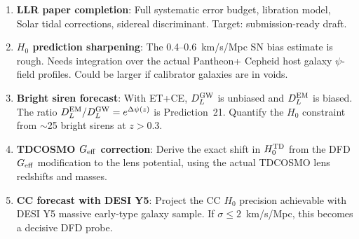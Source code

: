 \documentclass[11pt,a4paper]{article}
\newcommand{\Dpsi}{\Delta\psi}
\begin{document}
\begin{enumerate}

\item \textbf{LLR paper completion}: Full systematic error budget,
  libration model, Solar tidal corrections, sidereal discriminant.
  Target: submission-ready draft.

\item \textbf{$H_0$ prediction sharpening}: The 0.4--0.6~km/s/Mpc
  SN bias estimate is rough. Needs integration over the actual
  Pantheon+ Cepheid host galaxy $\psi$-field profiles. Could be
  larger if calibrator galaxies are in voids.

\item \textbf{Bright siren forecast}: With ET+CE, $D_L^{\rm GW}$
  is unbiased and $D_L^{\rm EM}$ is biased. The ratio
  $D_L^{\rm EM}/D_L^{\rm GW} = e^{\Dpsi(z)}$ is Prediction~21.
  Quantify the $H_0$ constraint from $\sim$25 bright sirens
  at $z > 0.3$.

\item \textbf{TDCOSMO $G_{\rm eff}$ correction}: Derive the
  exact shift in $H_0^{\rm TD}$ from the DFD $G_{\rm eff}$
  modification to the lens potential, using the actual
  TDCOSMO lens redshifts and masses.

\item \textbf{CC forecast with DESI Y5}: Project the CC $H_0$
  precision achievable with DESI Y5 massive early-type galaxy
  sample. If $\sigma \leq 2$~km/s/Mpc, this becomes a
  decisive DFD probe.

\end{enumerate}
\end{document}

